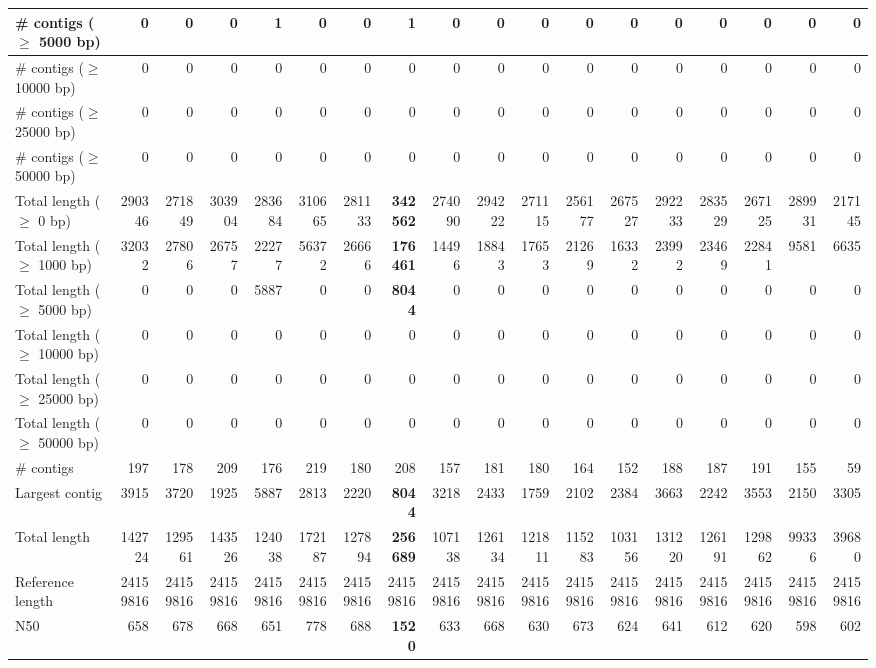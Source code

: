 \documentclass[12pt,a4paper]{article}
\begin{document}
\begin{table}[ht]
\begin{center}
\begin{tabular}{|l*{17}{|r}|}
\# contigs ($\geq$ 5000 bp) & 0 & 0 & 0 & 1 & 0 & 0 & 1 & 0 & 0 & 0 & 0 & 0 & 0 & 0 & 0 & 0 & 0 \\ \hline
\# contigs ($\geq$ 10000 bp) & 0 & 0 & 0 & 0 & 0 & 0 & 0 & 0 & 0 & 0 & 0 & 0 & 0 & 0 & 0 & 0 & 0 \\ \hline
\# contigs ($\geq$ 25000 bp) & 0 & 0 & 0 & 0 & 0 & 0 & 0 & 0 & 0 & 0 & 0 & 0 & 0 & 0 & 0 & 0 & 0 \\ \hline
\# contigs ($\geq$ 50000 bp) & 0 & 0 & 0 & 0 & 0 & 0 & 0 & 0 & 0 & 0 & 0 & 0 & 0 & 0 & 0 & 0 & 0 \\ \hline
Total length ($\geq$ 0 bp) & 290346 & 271849 & 303904 & 283684 & 310665 & 281133 & {\bf 342562} & 274090 & 294222 & 271115 & 256177 & 267527 & 292233 & 283529 & 267125 & 289931 & 217145 \\ \hline
Total length ($\geq$ 1000 bp) & 32032 & 27806 & 26757 & 22277 & 56372 & 26666 & {\bf 176461} & 14496 & 18843 & 17653 & 21269 & 16332 & 23992 & 23469 & 22841 & 9581 & 6635 \\ \hline
Total length ($\geq$ 5000 bp) & 0 & 0 & 0 & 5887 & 0 & 0 & {\bf 8044} & 0 & 0 & 0 & 0 & 0 & 0 & 0 & 0 & 0 & 0 \\ \hline
Total length ($\geq$ 10000 bp) & 0 & 0 & 0 & 0 & 0 & 0 & 0 & 0 & 0 & 0 & 0 & 0 & 0 & 0 & 0 & 0 & 0 \\ \hline
Total length ($\geq$ 25000 bp) & 0 & 0 & 0 & 0 & 0 & 0 & 0 & 0 & 0 & 0 & 0 & 0 & 0 & 0 & 0 & 0 & 0 \\ \hline
Total length ($\geq$ 50000 bp) & 0 & 0 & 0 & 0 & 0 & 0 & 0 & 0 & 0 & 0 & 0 & 0 & 0 & 0 & 0 & 0 & 0 \\ \hline
\# contigs & 197 & 178 & 209 & 176 & 219 & 180 & 208 & 157 & 181 & 180 & 164 & 152 & 188 & 187 & 191 & 155 & 59 \\ \hline
Largest contig & 3915 & 3720 & 1925 & 5887 & 2813 & 2220 & {\bf 8044} & 3218 & 2433 & 1759 & 2102 & 2384 & 3663 & 2242 & 3553 & 2150 & 3305 \\ \hline
Total length & 142724 & 129561 & 143526 & 124038 & 172187 & 127894 & {\bf 256689} & 107138 & 126134 & 121811 & 115283 & 103156 & 131220 & 126191 & 129862 & 99336 & 39680 \\ \hline
Reference length & 24159816 & 24159816 & 24159816 & 24159816 & 24159816 & 24159816 & 24159816 & 24159816 & 24159816 & 24159816 & 24159816 & 24159816 & 24159816 & 24159816 & 24159816 & 24159816 & 24159816 \\ \hline
N50 & 658 & 678 & 668 & 651 & 778 & 688 & {\bf 1520} & 633 & 668 & 630 & 673 & 624 & 641 & 612 & 620 & 598 & 602 \\ \hline

\end{tabular}
\end{center}
\end{table}
\end{document}
